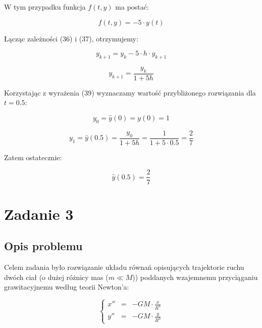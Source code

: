 \documentclass{article}
\begin{document}
	W tym przypadku funkcja $f(t, y)$ ma postać:

	\begin{equation}
		f(t, y) = -5 \cdot y(t)
	\end{equation}

	Łącząc zależności (36) i (37), otrzymujemy:

	\begin{equation}
		y_{k+1} = y_k - 5 \cdot h \cdot y_{k+1}
	\end{equation}

	\begin{equation}
		y_{k+1} = \frac{y_k}{1 + 5h}
	\end{equation}

	Korzystając z wyrażenia (39) wyznaczamy wartość przybliżonego rozwiązania dla $t = 0.5$:

	\begin{equation}
		y_0 = \hat{y}(0) = y(0) = 1
	\end{equation}

	\begin{equation}
		y_1 = \hat{y} (0.5) = \frac{y_0}{1+5h} = \frac{1}{1+5 \cdot 0.5} = \frac{2}{7} 
	\end{equation}

	Zatem ostatecznie:

	\begin{equation}
		\hat{y} (0.5) = \frac{2}{7}
	\end{equation}


	\newpage

	\section*{Zadanie 3}

	\subsection*{Opis problemu}

	Celem zadania było rozwiązanie układu równań opisujących trajektorie ruchu dwóch ciał (o dużej różnicy mas ($m \ll M$)) poddanych wzajemnemu przyciąganiu grawitacyjnemu według teorii Newton'a:

	\begin{equation}
		\left\{\begin{array}{rcl}
			x'' &=& -GM \cdot \frac{x}{R^3}\\
			y'' &=& -GM \cdot \frac{y}{R^3}
			\end{array} \right.
	\end{equation}
\end{document}

